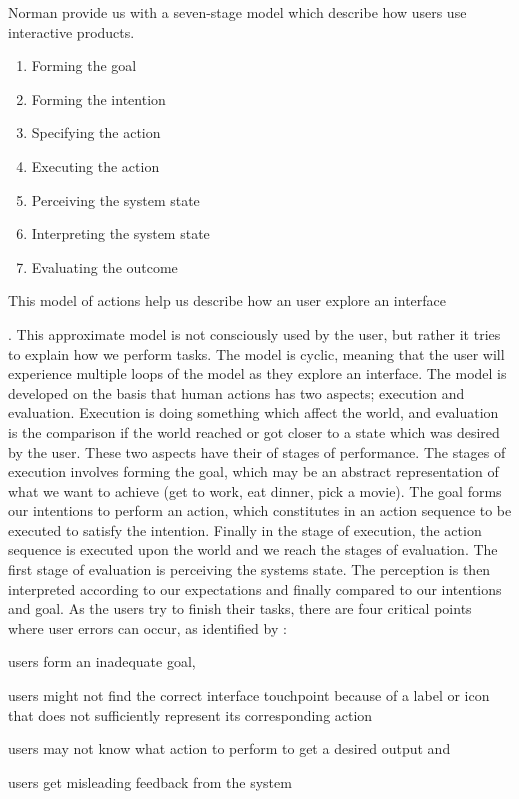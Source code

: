 Norman \cite{Norman2013a} provide us with a seven-stage model which describe how users use interactive products.
\begin{enumerate}
  \item Forming the goal
  \item Forming the intention
  \item Specifying the action
  \item Executing the action
  \item Perceiving the system state
  \item Interpreting the system state
  \item Evaluating the outcome
\end{enumerate}

This model of actions help us describe how an user explore an interface \cite{}. This approximate model \cite{Norman2013a} is not consciously used by the user, but rather it tries to explain how we perform tasks. The model is cyclic, meaning that the user will experience multiple loops of the model as they explore an interface. The model is developed on the basis that human actions has two aspects; execution and evaluation. Execution is doing something which affect the world, and evaluation is the comparison if the world reached or got closer to a state which was desired by the user. These two aspects have their of stages of performance. The stages of execution involves forming the goal, which may be an abstract representation of what we want to achieve (get to work, eat dinner, pick a movie). The goal forms our intentions to perform an action, which constitutes in an action sequence to be executed to satisfy the intention. Finally in the stage of execution, the action sequence is executed upon the world and we reach the stages of evaluation. The first stage of evaluation is perceiving the systems state. The perception is then interpreted according to our expectations and finally compared to our intentions and goal. As the users try to finish their tasks, there are four critical points where user errors can occur, as identified by \cite{Shneiderman2004}:
\begin{enumerate*}[label=(\(\arabic*\))]
  \item users form an inadequate goal,
  \item users might not find the correct interface touchpoint because of a label or icon that does not sufficiently represent its corresponding action
  \item users may not know what action to perform to get a desired output and
  \item users get misleading feedback from the system
\end{enumerate*}

